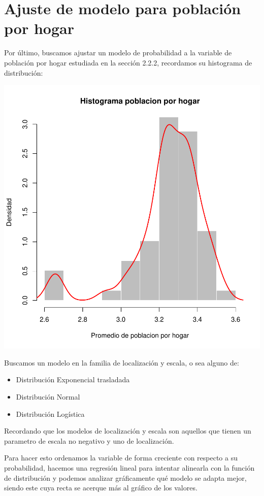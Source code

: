 \documentclass[11pt]{article}
\begin{document}
\section{Ajuste de modelo para población por hogar}

Por último, buscamos ajustar un modelo de probabilidad a la variable de población por hogar estudiada en la sección 2.2.2, recordamos su histograma de distribución:

\begin{center}
    \includegraphics[scale = 0.5]{histph}
\end{center}

Buscamos un modelo en la familia de localización y escala, o sea alguno de:

\begin{itemize}
    \item Distribución Exponencial trasladada
    \item Distribución Normal
    \item Distribución Logística
\end{itemize}

Recordando que los modelos de localización y escala son aquellos que tienen un parametro de escala no negativo y uno de localización.

Para hacer esto ordenamos la variable de forma creciente con respecto a su probabilidad, hacemos una regresión lineal para intentar alinearla con la función de distribución y podemos analizar gráficamente qué modelo se adapta mejor, siendo este cuya recta se acerque más al gráfico de los valores.
\end{document}
